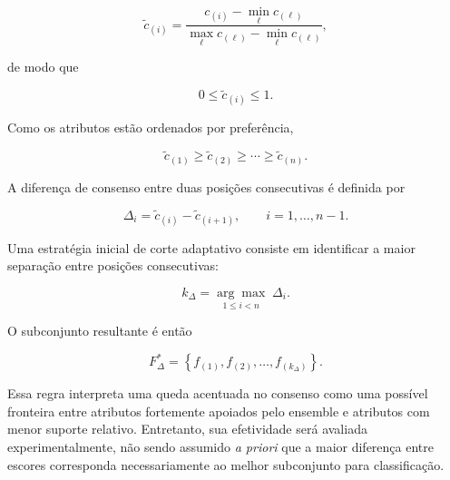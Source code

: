 \begin{equation}
    \tilde{c}_{(i)}
    =
    \frac{
        c_{(i)}-\min_{\ell}c_{(\ell)}
    }{
        \max_{\ell}c_{(\ell)}
        -
        \min_{\ell}c_{(\ell)}
    },
    \label{eq:normalizacao-consenso-ac-efs}
\end{equation}

de modo que

\begin{equation}
    0\leq\tilde{c}_{(i)}\leq1.
\end{equation}

Como os atributos estão ordenados por preferência,

\begin{equation}
    \tilde{c}_{(1)}
    \geq
    \tilde{c}_{(2)}
    \geq
    \cdots
    \geq
    \tilde{c}_{(n)}.
\end{equation}

A diferença de consenso entre duas posições consecutivas é definida por

\begin{equation}
    \Delta_i
    =
    \tilde{c}_{(i)}
    -
    \tilde{c}_{(i+1)},
    \qquad
    i=1,\ldots,n-1.
    \label{eq:queda-consenso-ac-efs}
\end{equation}

Uma estratégia inicial de corte adaptativo consiste em identificar a maior
separação entre posições consecutivas:

\begin{equation}
    k_{\Delta}
    =
    \underset{1\leq i<n}
    {\arg\max}
    \;
    \Delta_i.
    \label{eq:corte-maior-queda-ac-efs}
\end{equation}

O subconjunto resultante é então

\begin{equation}
    F^{*}_{\Delta}
    =
    \left\{
        f_{(1)},f_{(2)},\ldots,f_{(k_{\Delta})}
    \right\}.
    \label{eq:subset-adaptativo-ac-efs}
\end{equation}

Essa regra interpreta uma queda acentuada no consenso como uma possível
fronteira entre atributos fortemente apoiados pelo ensemble e atributos com
menor suporte relativo. Entretanto, sua efetividade será avaliada
experimentalmente, não sendo assumido \textit{a priori} que a maior diferença
entre escores corresponda necessariamente ao melhor subconjunto para
classificação.


